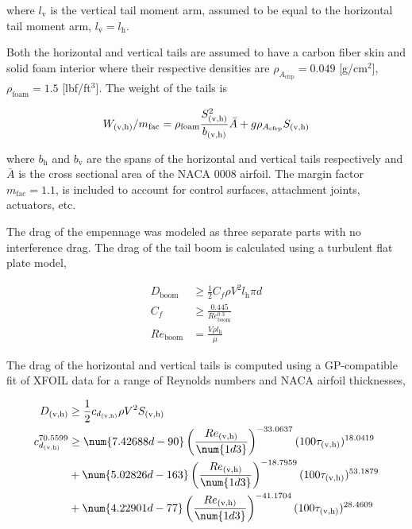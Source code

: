 where $l_{\text{v}}$ is the vertical tail moment arm, assumed to be equal to the horizontal tail moment arm, $l_{\text{v}} = l_{\text{h}}$.

Both the horizontal and vertical tails are assumed to have a carbon fiber skin and solid foam interior where their respective densities are $\rho_{A_{\text{cfrp}}} = 0.049$ [g/cm$^2$], $\rho_{\text{foam}} = 1.5$ [lbf/ft$^3$]. 
The weight of the tails is

\begin{equation}
    W_{\text{(v,h)}}/m_{\text{fac}} = \rho_{\text{foam}} \frac{S_{\text{(v,h)}}^2}{b_{\text{(v,h)}}} \bar{A} + g\rho_{A_{\text{cfrp}}} S_{\text{(v,h)}} \\
\end{equation}

where $b_{\text{h}}$ and $b_{\text{v}}$ are the spans of the horizontal and vertical tails respectively and $\bar{A}$ is the cross sectional area of the NACA 0008 airfoil. The margin factor $m_{\text{fac}}=1.1$, is included to account for control surfaces, attachment joints, actuators, etc. 

The drag of the empennage was modeled as three separate parts with no interference drag.  The drag of the tail boom is calculated using a turbulent flat plate model,

\begin{align}
    \label{e:boomdrag}
    D_{\text{boom}} &\geq \frac{1}{2} C_f \rho V^2 l_{\text{h}}\pi d \\
    C_f &\geq \frac{0.445}{Re_{\text{boom}}^{0.3}} \\
    Re_{\text{boom}} &= \frac{V\rho l_{\text{h}}}{\mu}
\end{align}

The drag of the horizontal and vertical tails is computed using a GP-compatible fit of XFOIL data for a range of Reynolds numbers and NACA airfoil thicknesses,

\begin{align}
    D_{\text{(v,h)}} &\geq \frac{1}{2} c_{d_{\text{(v,h)}}} \rho V^2 S_{\text{(v,h)}} \\
    \label{e:taildrag}
    c_{d_{\text{(v,h)}}}^{70.5599} &\geq \num{7.42688d-90} \left( \frac{Re_{\text{(v,h)}}}{\num{1d3}} \right)^{-33.0637}(100 \tau_{\text{(v,h)}})^{18.0419}  \nonumber \\
                 & + \num{5.02826d-163}\left(\frac{Re_{\text{(v,h)}}}{\num{1d3}}\right)^{-18.7959} (100\tau_{\text{(v,h)}})^{53.1879} \\
                 &+ \num{4.22901d-77}\left(\frac{Re_{\text{(v,h)}}}{\num{1d3}}\right)^{-41.1704} (100\tau_{\text{(v,h)}})^{28.4609} \nonumber \\
\end{align}

